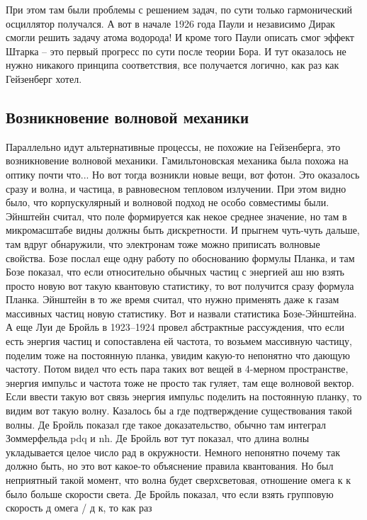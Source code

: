 \documentclass[a4paper, 12pt]{article}
\begin{document}
При этом там были проблемы с решением задач, по сути только 
гармонический осциллятор получался. А вот в начале 1926 года Паули 
и независимо Дирак смогли решить задачу атома водорода! И кроме того 
Паули описать смог эффект Штарка -- это первый прогресс по сути после 
теории Бора. И тут оказалось не нужно никакого принципа соответствия, 
все получается логично, как раз как Гейзенберг хотел.

\subsection{Возникновение волновой механики}

Параллельно идут альтернативные процессы, не похожие на Гейзенберга, это 
возникновение волновой механики. Гамильтоновская механика была похожа на 
оптику почти что... Но вот тогда возникли новые вещи, вот фотон. Это 
оказалось сразу и волна, и частица, в равновесном тепловом излучении. 
При этом видно было, что корпускулярный и волновой подход не особо 
совместимы были. Эйнштейн считал, что поле формируется как некое среднее 
значение, но там в микромасштабе видны должны быть дискретности. 
И прыгнем чуть-чуть дальше, там вдруг обнаружили, что электронам тоже 
можно приписать волновые свойства. Бозе послал еще одну работу по 
обоснованию формулы Планка, и там Бозе показал, что если относительно 
обычных частиц с энергией аш ню взять просто новую вот такую квантовую 
статистику, то вот получится сразу формула Планка. Эйнштейн в то же 
время считал, что нужно применять даже к газам массивных частиц новую 
статистику. Вот и назвали статистика Бозе-Эйнштейна. А еще Луи де Бройль 
в 1923--1924 провел абстрактные рассуждения, что если есть энергия 
частиц и сопоставлена ей частота, то возьмем массивную частицу, поделим 
тоже на постоянную планка, увидим какую-то непонятно что дающую частоту. 
Потом видел что есть пара таких вот вещей в 4-мерном пространстве, 
энергия импульс и частота тоже не просто так гуляет, там еще волновой 
вектор. Если ввести такую вот связь энергия импульс поделить на 
постоянную планку, то видим вот такую волну. Казалось бы а где 
подтверждение существования такой волны. Де Бройль показал где такое 
доказательство, обычно там интеграл Зоммерфельда pdq и nh. Де Бройль вот 
тут показал, что длина волны укладывается целое число рад в окружности. 
Немного непонятно почему так должно быть, но это вот какое-то объяснение 
правила квантования. Но был неприятный такой момент, что волна будет 
сверхсветовая, отношение омега к к было больше скорости света. Де Бройль 
показал, что если взять групповую скорость д омега / д к, то как раз 
\end{document}
